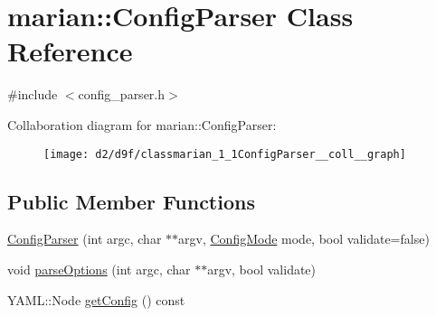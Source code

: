\hypertarget{classmarian_1_1ConfigParser}{}\section{marian\+:\+:Config\+Parser Class Reference}
\label{classmarian_1_1ConfigParser}


{\ttfamily \#include $<$config\+\_\+parser.\+h$>$}



Collaboration diagram for marian\+:\+:Config\+Parser\+:
\nopagebreak
\begin{figure}[H]
\begin{center}
\leavevmode
\texttt{[image: d2/d9f/classmarian\_1\_1ConfigParser\_\_coll\_\_graph]}
\end{center}
\end{figure}
\subsection*{Public Member Functions}
\begin{DoxyCompactItemize}
\item 
\hyperlink{classmarian_1_1ConfigParser_a49dfb61d0168ee1d126946f777c355ae}{Config\+Parser} (int argc, char $\ast$$\ast$argv, \hyperlink{namespacemarian_aaddd4b008ff5352b1fe7e16574f7e1f9}{Config\+Mode} mode, bool validate=false)
\item 
void \hyperlink{classmarian_1_1ConfigParser_a538eb5f3c97b6a25a2fc0c7a8f015425}{parse\+Options} (int argc, char $\ast$$\ast$argv, bool validate)
\item 
Y\+A\+M\+L\+::\+Node \hyperlink{classmarian_1_1ConfigParser_adccbbc01f03e141aa80dd3baf94eae58}{get\+Config} () const 
\end{DoxyCompactItemize}
